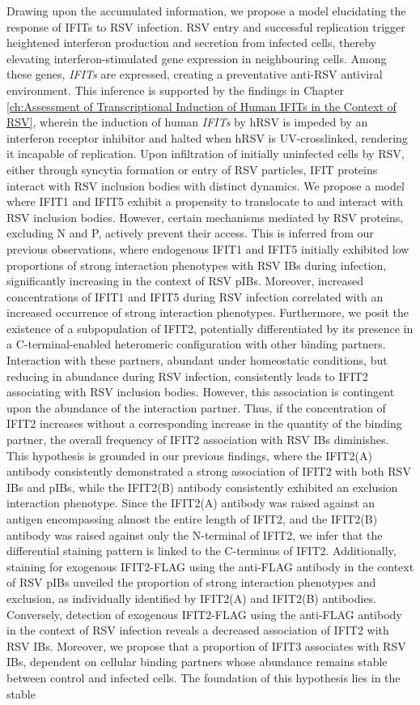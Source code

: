 Drawing upon the accumulated information, we propose a model elucidating the response of IFITs to RSV infection. RSV entry and successful replication trigger heightened interferon production and secretion from infected cells, thereby elevating interferon-stimulated gene expression in neighbouring cells. Among these genes, \textit{IFITs} are expressed, creating a preventative anti-RSV antiviral environment. This inference is supported by the findings in Chapter \ref{ch:Assessment of Transcriptional Induction of Human IFITs in the Context of RSV}, wherein the induction of human \textit{IFITs} by hRSV is impeded by an interferon receptor inhibitor and halted when hRSV is UV-crosslinked, rendering it incapable of replication. Upon infiltration of initially uninfected cells by RSV, either through syncytia formation or entry of RSV particles, IFIT proteins interact with RSV inclusion bodies with distinct dynamics. We propose a model where IFIT1 and IFIT5 exhibit a propensity to translocate to and interact with RSV inclusion bodies. However, certain mechanisms mediated by RSV proteins, excluding N and P, actively prevent their access. This is inferred from our previous observations, where endogenous IFIT1 and IFIT5 initially exhibited low proportions of strong interaction phenotypes with RSV IBs during infection, significantly increasing in the context of RSV pIBs. Moreover, increased concentrations of IFIT1 and IFIT5 during RSV infection correlated with an increased occurrence of strong interaction phenotypes. Furthermore, we posit the existence of a subpopulation of IFIT2, potentially differentiated by its presence in a C-terminal-enabled heteromeric configuration with other binding partners. Interaction with these partners, abundant under homeostatic conditions, but reducing in abundance during RSV infection, consistently leads to IFIT2 associating with RSV inclusion bodies. However, this association is contingent upon the abundance of the interaction partner. Thus, if the concentration of IFIT2 increases without a corresponding increase in the quantity of the binding partner, the overall frequency of IFIT2 association with RSV IBs diminishes. This hypothesis is grounded in our previous findings, where the IFIT2(A) antibody consistently demonstrated a strong association of IFIT2 with both RSV IBs and pIBs, while the IFIT2(B) antibody consistently exhibited an exclusion interaction phenotype. Since the IFIT2(A) antibody was raised against an antigen encompassing almost the entire length of IFIT2, and the IFIT2(B) antibody was raised against only the N-terminal of IFIT2, we infer that the differential staining pattern is linked to the C-terminus of IFIT2. Additionally, staining for exogenous IFIT2-FLAG using the anti-FLAG antibody in the context of RSV pIBs unveiled the proportion of strong interaction phenotypes and exclusion, as individually identified by IFIT2(A) and IFIT2(B) antibodies. Conversely, detection of exogenous IFIT2-FLAG using the anti-FLAG antibody in the context of RSV infection reveals a decreased association of IFIT2 with RSV IBs. Moreover, we propose that a proportion of IFIT3 associates with RSV IBs, dependent on cellular binding partners whose abundance remains stable between control and infected cells. The foundation of this hypothesis lies in the stable 